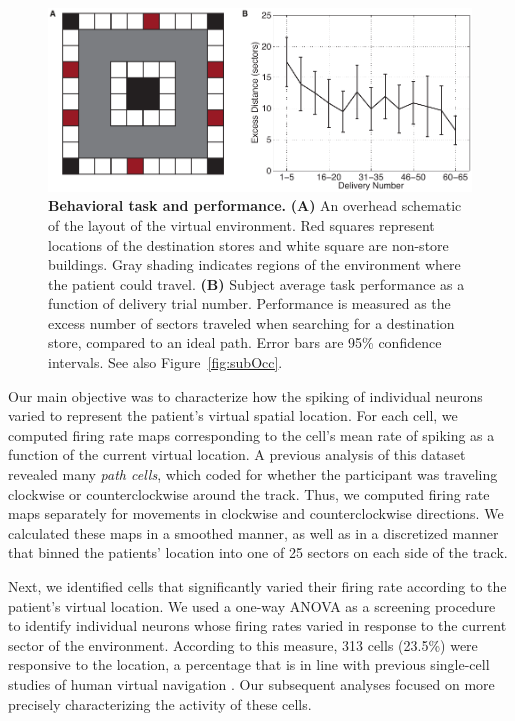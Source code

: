 \begin{figure} \centering \includegraphics[width=.9\textwidth]{./tex/linearGrids/figs/Figure1} \caption[Behavioral task and performance]{\textbf{Behavioral task and performance.} \textbf{(A)} An overhead schematic of the layout of the virtual environment. Red squares represent locations of the destination stores and white square are non-store buildings. Gray shading indicates regions of the environment where the patient could travel. \textbf{(B)} Subject average task performance as a function of delivery trial number. Performance is measured as the excess number of sectors traveled when searching for a destination store, compared to an ideal path. Error bars are 95\% confidence intervals. See also Figure~\ref{fig:subOcc}.} \label{fig:behaviorCurrBio}
\end{figure}


Our main objective was to characterize how the spiking of individual neurons varied to represent  the patient's virtual spatial location. For each cell, we computed firing rate maps corresponding to the cell's mean rate of spiking as a function of the current  virtual location. A previous analysis of this dataset \cite{JacoEtal10} revealed  many \emph{path cells}, which coded for whether the participant was traveling clockwise or counterclockwise around the track. Thus, we computed firing rate maps separately for movements in clockwise and counterclockwise directions. We  calculated these maps  in a smoothed manner, as well as in a discretized manner that binned the patients' location into one of 25 sectors on each side of the track.

Next, we identified cells that significantly varied their firing rate according to the patient's virtual location. We used a one-way ANOVA as a screening procedure to identify individual neurons whose firing rates varied in response to the current sector of the environment. According to this measure, 313  cells (23.5\%) were responsive to the location, a percentage that is in line with previous single-cell studies of human virtual navigation \cite{EkstEtal03,JacoEtal10,JacoEtal13}. Our subsequent analyses focused on more precisely characterizing the activity of these cells.


